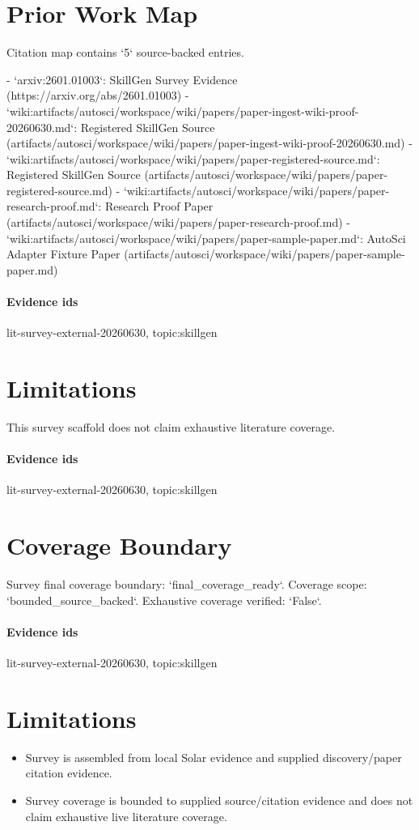\documentclass{article}
\begin{document}
\section{Prior Work Map}
Citation map contains `5` source-backed entries.

- `arxiv:2601.01003`: SkillGen Survey Evidence (https://arxiv.org/abs/2601.01003)
- `wiki:artifacts/autosci/workspace/wiki/papers/paper-ingest-wiki-proof-20260630.md`: Registered SkillGen Source (artifacts/autosci/workspace/wiki/papers/paper-ingest-wiki-proof-20260630.md)
- `wiki:artifacts/autosci/workspace/wiki/papers/paper-registered-source.md`: Registered SkillGen Source (artifacts/autosci/workspace/wiki/papers/paper-registered-source.md)
- `wiki:artifacts/autosci/workspace/wiki/papers/paper-research-proof.md`: Research Proof Paper (artifacts/autosci/workspace/wiki/papers/paper-research-proof.md)
- `wiki:artifacts/autosci/workspace/wiki/papers/paper-sample-paper.md`: AutoSci Adapter Fixture Paper (artifacts/autosci/workspace/wiki/papers/paper-sample-paper.md)

\paragraph{Evidence ids} lit-survey-external-20260630, topic:skillgen

\section{Limitations}
This survey scaffold does not claim exhaustive literature coverage.

\paragraph{Evidence ids} lit-survey-external-20260630, topic:skillgen

\section{Coverage Boundary}
Survey final coverage boundary: `final\_coverage\_ready`. Coverage scope: `bounded\_source\_backed`. Exhaustive coverage verified: `False`.

\paragraph{Evidence ids} lit-survey-external-20260630, topic:skillgen

\section{Limitations}

\begin{itemize}\item Survey is assembled from local Solar evidence and supplied discovery/paper citation evidence.\end{itemize}
\begin{itemize}\item Survey coverage is bounded to supplied source/citation evidence and does not claim exhaustive live literature coverage.\end{itemize}
\end{document}

